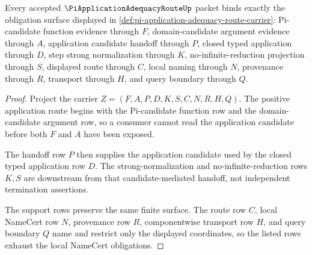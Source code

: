 \begin{theorem}
\label{thm:pi-application-adequacy-route-namecert-obligations}
Every accepted $\PiApplicationAdequacyRouteUp$ packet binds exactly the obligation surface displayed in \autoref{def:pi-application-adequacy-route-carrier}: Pi-candidate function evidence through $F$, domain-candidate argument evidence through $A$, application candidate handoff through $P$, closed typed application through $D$, step strong normalization through $K$, no-infinite-reduction projection through $S$, displayed route through $C$, local naming through $N$, provenance through $R$, transport through $H$, and query boundary through $Q$.
\end{theorem}
\begin{proof}
Project the carrier $Z=(F,A,P,D,K,S,C,N,R,H,Q)$. The positive application route begins with the Pi-candidate function row and the domain-candidate argument row, so a consumer cannot read the application candidate before both $F$ and $A$ have been exposed.

The handoff row $P$ then supplies the application candidate used by the closed typed application row $D$. The strong-normalization and no-infinite-reduction rows $K,S$ are downstream from that candidate-mediated handoff, not independent termination assertions.

The support rows preserve the same finite surface. The route row $C$, local NameCert row $N$, provenance row $R$, componentwise transport row $H$, and query boundary $Q$ name and restrict only the displayed coordinates, so the listed rows exhaust the local NameCert obligations.
\end{proof}

